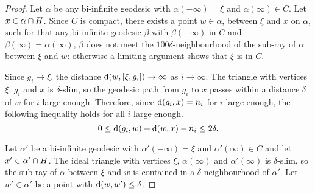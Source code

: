 \documentclass[a4paper]{article}
\begin{document}
\begin{proof}
  Let $\alpha$ be any bi-infinite geodesic with $\alpha(-\infty)=\xi$ and 
  $\alpha(\infty)\in C$. Let $x \in \alpha \cap H$. Since $C$ is
  compact, there exists a point $w \in \alpha$, between $\xi$ and $x$ on
  $\alpha$, such for that any bi-infinite geodesic $\beta$ with
  $\beta(-\infty)$ in $C$ and $\beta(\infty) = \alpha(\infty)$, $\beta$ does
  not meet the $100\delta$-neighbourhood of the sub-ray of $\alpha$ between
  $\xi$ and $w$: otherwise a limiting argument shows that $\xi$ is in $C$.

  Since $g_i \to \xi$, the distance $\operatorname{d}(w, [\xi, g_i]) \to \infty$ as
  $i\to\infty$. The triangle with vertices $\xi$, $g_i$ and $x$ is
  $\delta$-slim, so the geodesic path from $g_i$ to $x$ passes within a
  distance $\delta$ of $w$ for $i$ large enough. Therefore, since $\operatorname{d}(g_i,
  x) = n_i$ for $i$ large enough, the following inequality holds for all $i$
  large enough.
  \begin{equation*}
    0 \leq \operatorname{d}(g_i, w) + \operatorname{d}(w, x) - n_i \leq 2\delta.
  \end{equation*}

  Let $\alpha'$ be a bi-infinite geodesic with $\alpha'(-\infty) = \xi$ and
  $\alpha'(\infty) \in C$ and let $x' \in \alpha' \cap H$. The ideal
  triangle with vertices $\xi$, $\alpha(\infty)$ and $\alpha'(\infty)$ is
  $\delta$-slim, so the sub-ray of $\alpha$ between $\xi$ and $w$ is contained
  in a $\delta$-neighbourhood of $\alpha'$.  Let $w' \in \alpha'$ be a point
  with $\operatorname{d}(w, w') \leq \delta$. 
  

\end{proof}
\end{document}
